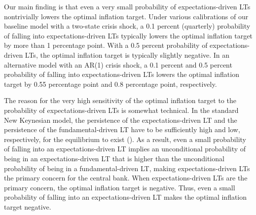 \documentclass[11pt]{article}
\begin{document}
	Our main finding is that even a very small probability of expectations-driven LTs nontrivially lowers the optimal inflation target. Under various calibrations of our baseline model with a two-state crisis shock, a 0.1 percent (quarterly) probability of falling into expectations-driven LTs typically lowers the optimal inflation target by more than 1 percentage point. With a 0.5 percent probability of expectations-driven LTs, the optimal inflation target is typically slightly negative. In an alternative model with an AR(1) crisis shock, a 0.1 percent and 0.5 percent probability of falling into expectations-driven LTs lowers the optimal inflation target by 0.55 percentage point and 0.8 percentage point, respectively.


	The reason for the very high sensitivity of the optimal inflation target to the probability of expectations-driven LTs is somewhat technical. In the standard New Keynesian model, the persistence of the expectations-driven LT and the persistence of the fundamental-driven LT have to be sufficiently high and low, respectively, for the equilibrium to exist (\citet{NakataSchmidt2019}). As a result, even a small probability of falling into an expectations-driven LT implies an unconditional probability of being in an expectations-driven LT that is higher than the unconditional probability of being in a fundamental-driven LT, making expectations-driven LTs the primary concern for the central bank. When expectations-driven LTs are the primary concern, the optimal inflation target is negative. Thus, even a small probability of falling into an expectations-driven LT makes the optimal inflation target negative.

\end{document}
